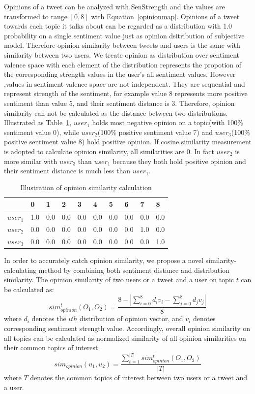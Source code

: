 \documentclass[letterpaper]{article}
\begin{document}
Opinions of a tweet can be analyzed with SenStrength and the values are transformed to range $ \left[ 0,8 \right]  $  with Equation~\ref{opinionmap}.
Opinions of a tweet towards each topic it talks about can be regarded as a distribution with 1.0 probability on a single sentiment value just as opinion dsitribution of subjective model. 
Therefore opinion similarity between tweets and users is the same with similarity between two users.   
We treate opinion as distribution over sentiment valence space with each element of the distribution represents the propotion of the corresponding strength values in the user's all sentiment values. 
However ,values in sentiment valence space are not independent. 
They are sequential and represent strength of the sentiment, for example value 8 represents more positive sentiment than value 5, and their sentiment distance is 3.
Therefore, opinion similarity can not be calculated as the distance between two distributions.
Illustrated as Table~\ref{tab1}, $ user_{1} $ holds most negative opinion on a topic(with 100\% sentiment value 0), while $ user_{2} $(100\% positive sentiment value 7) and $ user_{3} $(100\% positive sentiment value 8) hold positive opinion.
If cosine similarity measurement is adopted to calculate opinion similarity, all similarities are 0.
In fact $ user_{2} $ is more similar with $ user_{3} $ than $ user_{1} $ because they both hold positive opinion and their sentiment distance is much less than $ user_{1} $. 
\begin{table}[h]
\scriptsize
\centering
\caption{Illustration of opinion similarity calculation}
\label{tab1}
\begin{tabular}{|l|l|l|l|l|l|l|l|l|l|}
\hline
 & 0 & 1& 2 & 3 & 4 & 5 & 6 & 7 & 8 \\
\hline
$user_{1}$ & 1.0 & 0.0 & 0.0 & 0.0 & 0.0 & 0.0 & 0.0 & 0.0 & 0.0 \\
\hline
$user_{2}$ & 0.0 & 0.0 & 0.0 & 0.0 & 0.0 & 0.0 & 0.0 & 1.0 & 0.0 \\
\hline
$user_{3}$ & 0.0 & 0.0 & 0.0 & 0.0 & 0.0 & 0.0 & 0.0 & 0.0 & 1.0 \\
\hline
\end{tabular}
\end{table}  
In order to accurately catch opinion similarity, we propose a novel similarity-calculating method by combining both sentiment distance and distribution similarity.
The opinion similarity of two users or a tweet and a user on topic $ t $ can be calculated as: 
\begin{equation}
sim_{opinion}^{t}(O_{1},O_{2})=\dfrac{8-|\sum_{i=0}^{8}d_{i}v_{i}-\sum_{j=0}^{8}d_{j}v_{j}|}{8}
\end{equation}
where $ d_{i} $ denotes the $ ith $ distribution of opinion vector, and $ v_{i} $ denotes corresponding sentiment strength value.
Accordingly, overall opinion similarity on all topics can be calculated as normalized similarity of all opinion similarities on their common topics of interest. 
\begin{equation}
sim_{opinion}(u_{1},u_{2})=\dfrac{\sum_{t=1}^{|T|}sim_{opinion}^{t}(O_{1},O_{2})}{|T|}
\end{equation}
where $ T $ denotes the common topics of interest between two users or a tweet and a user.
\end{document}
